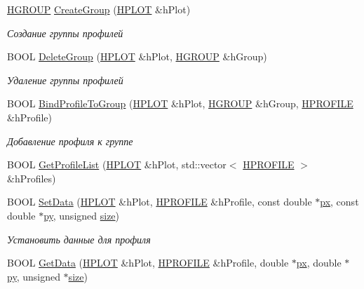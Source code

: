 \begin{DoxyCompactItemize}
\hyperlink{classxyplot_1_1_h_g_r_o_u_p}{H\-G\-R\-O\-U\-P} \hyperlink{group__gr_output_gaa9973935dcf6968295717ca9e8e832c0}{Create\-Group} (\hyperlink{classxyplot_1_1_h_p_l_o_t}{H\-P\-L\-O\-T} \&h\-Plot)
\begin{DoxyCompactList}\small\item\em Создание группы профилей \end{DoxyCompactList}\item 
B\-O\-O\-L \hyperlink{group__gr_output_gae089459d5fab87f702abe1ac196906dc}{Delete\-Group} (\hyperlink{classxyplot_1_1_h_p_l_o_t}{H\-P\-L\-O\-T} \&h\-Plot, \hyperlink{classxyplot_1_1_h_g_r_o_u_p}{H\-G\-R\-O\-U\-P} \&h\-Group)
\begin{DoxyCompactList}\small\item\em Удаление группы профилей \end{DoxyCompactList}\item 
B\-O\-O\-L \hyperlink{group__gr_output_ga8e52043c4085813433a831d07687ebc9}{Bind\-Profile\-To\-Group} (\hyperlink{classxyplot_1_1_h_p_l_o_t}{H\-P\-L\-O\-T} \&h\-Plot, \hyperlink{classxyplot_1_1_h_g_r_o_u_p}{H\-G\-R\-O\-U\-P} \&h\-Group, \hyperlink{classxyplot_1_1_h_p_r_o_f_i_l_e}{H\-P\-R\-O\-F\-I\-L\-E} \&h\-Profile)
\begin{DoxyCompactList}\small\item\em Добавление профиля к группе \end{DoxyCompactList}\item 
B\-O\-O\-L \hyperlink{group__gr_output_gab01278bbb9ea9612d30f3cbe4c7805df}{Get\-Profile\-List} (\hyperlink{classxyplot_1_1_h_p_l_o_t}{H\-P\-L\-O\-T} \&h\-Plot, std\-::vector$<$ \hyperlink{classxyplot_1_1_h_p_r_o_f_i_l_e}{H\-P\-R\-O\-F\-I\-L\-E} $>$ \&h\-Profiles)
\item 
B\-O\-O\-L \hyperlink{group__gr_output_data_ga95d2b2960c45eb6368a9d1039bacdc0d}{Set\-Data} (\hyperlink{classxyplot_1_1_h_p_l_o_t}{H\-P\-L\-O\-T} \&h\-Plot, \hyperlink{classxyplot_1_1_h_p_r_o_f_i_l_e}{H\-P\-R\-O\-F\-I\-L\-E} \&h\-Profile, const double $\ast$\hyperlink{namespacexyplot_aa88522a2f4371e38891cac7b5bc3e4aa}{px}, const double $\ast$\hyperlink{namespacexyplot_adc56454d6bac520db8907c6a206d3040}{py}, unsigned \hyperlink{namespacexyplot_a0e8516aaf446c174c28a4327a27dd9ce}{size})
\begin{DoxyCompactList}\small\item\em Установить данные для профиля \end{DoxyCompactList}\item 
B\-O\-O\-L \hyperlink{group__gr_output_data_ga6557de664a4b3b7fb8fd7ab2c9d736b9}{Get\-Data} (\hyperlink{classxyplot_1_1_h_p_l_o_t}{H\-P\-L\-O\-T} \&h\-Plot, \hyperlink{classxyplot_1_1_h_p_r_o_f_i_l_e}{H\-P\-R\-O\-F\-I\-L\-E} \&h\-Profile, double $\ast$\hyperlink{namespacexyplot_aa88522a2f4371e38891cac7b5bc3e4aa}{px}, double $\ast$\hyperlink{namespacexyplot_adc56454d6bac520db8907c6a206d3040}{py}, unsigned $\ast$\hyperlink{namespacexyplot_a0e8516aaf446c174c28a4327a27dd9ce}{size})

\end{DoxyCompactItemize}

